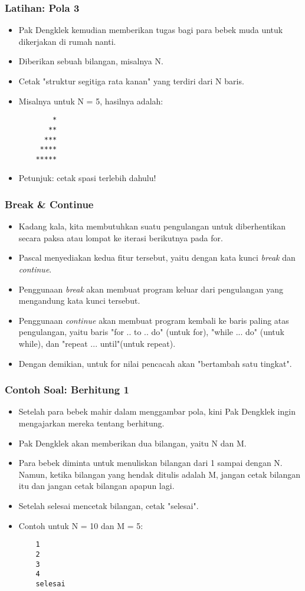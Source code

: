 \documentclass{beamer}
\begin{document}
\begin{frame}[fragile]
\frametitle{Latihan: Pola 3}
\begin{itemize}
	\item Pak Dengklek kemudian memberikan tugas bagi para bebek muda untuk dikerjakan di rumah nanti.
	\item Diberikan sebuah bilangan, misalnya N.
	\item Cetak "struktur segitiga rata kanan" yang terdiri dari N baris.
	\item Misalnya untuk N = 5, hasilnya adalah:
	\begin{lstlisting}
	    *
	   **
	  ***
	 ****
	*****
	\end{lstlisting} 
	\item Petunjuk: cetak spasi terlebih dahulu!
\end{itemize}
\end{frame}

\begin{frame}
\frametitle{Break \& Continue}
\begin{itemize}
	\item Kadang kala, kita membutuhkan suatu pengulangan untuk diberhentikan secara paksa atau lompat ke iterasi berikutnya pada for.
	\item Pascal menyediakan kedua fitur tersebut, yaitu dengan kata kunci \alert{\textit{break}} dan \alert{\textit{continue}}.
	\item Penggunaan \textit{break} akan membuat program keluar dari pengulangan yang mengandung kata kunci tersebut.
	\item Penggunaan \textit{continue} akan membuat program kembali ke baris paling atas pengulangan, yaitu baris "for .. to .. do" (untuk for), "while ... do" (untuk while), dan "repeat ... until"(untuk repeat).
	\item Dengan demikian, untuk for nilai pencacah akan "bertambah satu tingkat".
\end{itemize}
\end{frame}

\begin{frame}[fragile]
\frametitle{Contoh Soal: Berhitung 1}
\begin{itemize}
	\item Setelah para bebek mahir dalam menggambar pola, kini Pak Dengklek ingin mengajarkan mereka tentang berhitung.
	\item Pak Dengklek akan memberikan dua bilangan, yaitu N dan M.
	\item Para bebek diminta untuk menuliskan bilangan dari 1 sampai dengan N. Namun, ketika bilangan yang hendak ditulis adalah M, jangan cetak bilangan itu dan jangan cetak bilangan apapun lagi.
	\item Setelah selesai mencetak bilangan, cetak "selesai".
	\item Contoh untuk N = 10 dan M = 5:
	\begin{lstlisting}
	1
	2
	3
	4
	selesai
	\end{lstlisting}
\end{itemize}
\end{frame}
\end{document}
